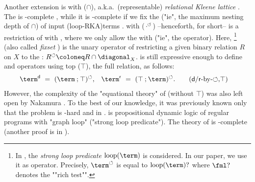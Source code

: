 \documentclass[a4paper,UKenglish,cleveref, autoref, thm-restate]{lipics-v2021}
\newcommand{\bl}{\cdot}
\newcommand{\defeq}{\coloneq}
\newcommand{\intersection}{\mathbin{\cap}}
\newcommand{\compo}{\mathbin{;}}
\newcommand{\lop}{\circlearrowleft}
\begin{document}
\begin{scope}
Another extension is  with \emph{} ($\intersection$), a.k.a.\ (representable) \emph{relational Kleene lattice} \cite{andrekaEquationalTheoryKleene2011}.
The  is -complete \cite{nakamuraPartialDerivativesGraphs2017,brunetPetriAutomata2017,nakamuraDerivativesGraphsPositive2025},
while it is -complete if we fix the  ("ie", the maximum nesting depth of $\intersection$) of input \kl(loop-RKA){terms} \cite{nakamuraDerivativesGraphsPositive2025}.
 with \emph{} ($\bl^{\lop}$) --henceforth, \emph{} for short-- \cite{nakamuraDerivativesGraphsPositive2025} is a restriction of  with ,
where we only allow the  with  ("ie", the  operator).
Here, \footnote{In \cite{daneckiPropositionalDynamicLogic1984}, the \emph{strong loop predicate} $\mathrm{loop}(\term)$ is considered. In our paper, we use it as operator.
Precisely, $\term^{\lop}$ is equal to $\mathrm{loop}(\term)?$ where $\fml?$ denotes the ""rich test"".}
\cite{daneckiPropositionalDynamicLogic1984,nakamuraUndecidabilityPositiveCalculus2024} (also called \emph{fixset} \cite{hirschAlgebraFunctionsAntidomain2016}) is the unary operator of restricting a given binary relation $R$ on $X$ to the :
$R^{\lop} \defeq R \cap \diagonal_{X}$.
 is still expressive enough to define  and  operators using top ($\top$), the full relation, as follows:
%
\begin{align*}
\term^{\mathsf{d}} ~&=~ (\term \compo \top)^{\lop}, &
\term^{\mathsf{r}} ~&=~ (\top \compo \term)^{\lop}.
\tag{$\mathsf{d}$/$\mathsf{r}$-by-$\lop$,$\top$}\label{equation: dom range by loop top}
\end{align*}
However, the complexity of the "equational theory" of  (without $\top$) was also left open by Nakamura \cite[\S 8]{nakamuraDerivativesGraphsPositive2025}.
To the best of our knowledge, it was previously known only that the problem is -hard \cite{meyerEquivalenceProblemRegular1972} and in  \cite{daneckiPropositionalDynamicLogic1984,gollerPDLIntersectionConverse2009}.
\AP
\intro*{} \cite{daneckiPropositionalDynamicLogic1984} is propositional dynamic logic of regular programs with "graph loop" ("strong loop predicate").
The theory of  is -complete \cite{daneckiPropositionalDynamicLogic1984} (another proof is in \cite[Corollary 4.9]{gollerPDLIntersectionConverse2009}).

\end{scope}
\end{document}
